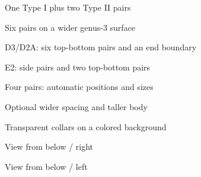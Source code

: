 \documentclass{article}
\begin{document}
\clearpage
\begin{center}
\Large One Type I plus two Type II pairs\par\bigskip
{}
\end{center}
\clearpage
\begin{center}
\Large Six pairs on a wider genus-3 surface\par\bigskip
{}
\end{center}
\clearpage
\begin{center}
\Large D3/D2A: six top-bottom pairs and an end boundary\par\bigskip
{}
\end{center}
\clearpage
\begin{center}
\Large E2: side pairs and two top-bottom pairs\par\bigskip
{}
\end{center}
\clearpage
\begin{center}
\Large Four pairs: automatic positions and sizes\par\bigskip
{}
\end{center}
\clearpage
\begin{center}
\Large Optional wider spacing and taller body\par\bigskip
{}
\end{center}
\clearpage
\begin{center}
\Large Transparent collars on a colored background\par\bigskip
{}
\end{center}
\clearpage
\begin{center}
\Large View from below / right\par\bigskip
{}
\end{center}
\clearpage
\begin{center}
\Large View from below / left\par\bigskip
{}
\end{center}
\end{document}
